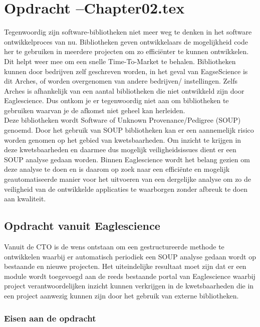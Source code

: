 
\chapter{Opdracht --Chapter02.tex} %

\label{ch:opdracht} %
Tegenwoordig zijn software-bibliotheken niet meer weg te denken in het software ontwikkelproces van nu. Bibliotheken geven ontwikkelaars de mogelijkheid code her te gebruiken in meerdere  projecten om zo effici\"enter te kunnen ontwikkelen. Dit helpt weer mee om een snelle Time-To-Market te behalen. Bibliotheken kunnen door bedrijven zelf geschreven worden, in het geval van EagseScience is dit Arches, of worden overgenomen van andere bedrijven/ instellingen. Zelfs Arches is afhankelijk van een aantal bibliotheken die niet ontwikkeld zijn door Eaglescience. Dus ontkom je er tegenwoordig niet aan om bibliotheken te gebruiken waarvan je de afkomst niet geheel kan herleiden. 
\\
Deze bibliotheken wordt Software of Unknown Provenance/Pedigree (SOUP) genoemd. Door het gebruik van SOUP bibliotheken kan er een aannemelijk risico worden genomen op het gebied van kwetsbaarheden. Om inzicht te krijgen in deze kwetsbaarheden en daarmee dus mogelijk veiligheidsissues dient er een SOUP analyse gedaan worden. Binnen Eaglescience wordt het belang gezien om deze analyse te doen en is daarom op zoek naar een efficiënte en mogelijk geautomatiseerde manier voor het uitvoeren van een dergelijke analyse om zo de veiligheid van de ontwikkelde applicaties te waarborgen zonder afbreuk te doen aan kwaliteit. 


\section{Opdracht vanuit Eaglescience}
Vanuit de CTO is de wens ontstaan om een gestructureerde methode te ontwikkelen waarbij er automatisch periodiek een SOUP analyse gedaan wordt op bestaande en nieuwe projecten. Het uiteindelijke resultaat moet zijn dat er een module wordt toegevoegd aan de reeds bestaande portal van Eaglescience waarbij project verantwoordelijken inzicht kunnen verkrijgen in de kwetsbaarheden die in een project aanwezig kunnen zijn door het gebruik van externe bibliotheken.

\subsection{Eisen aan de opdracht}

